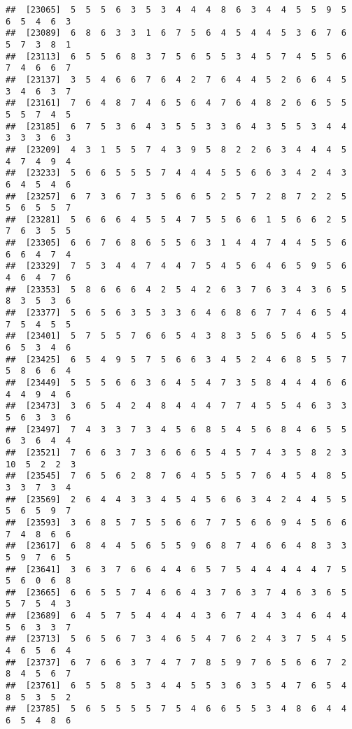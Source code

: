 \documentclass[
]{book}
\begin{document}
\begin{verbatim}
##  [23065]  5  5  5  6  3  5  3  4  4  4  8  6  3  4  4  5  5  9  5  6  5  4  6  3
##  [23089]  6  8  6  3  3  1  6  7  5  6  4  5  4  4  5  3  6  7  6  5  7  3  8  1
##  [23113]  6  5  5  6  8  3  7  5  6  5  5  3  4  5  7  4  5  5  6  7  4  6  6  7
##  [23137]  3  5  4  6  6  7  6  4  2  7  6  4  4  5  2  6  6  4  5  3  4  6  3  7
##  [23161]  7  6  4  8  7  4  6  5  6  4  7  6  4  8  2  6  6  5  5  5  5  7  4  5
##  [23185]  6  7  5  3  6  4  3  5  5  3  3  6  4  3  5  5  3  4  4  3  3  3  6  3
##  [23209]  4  3  1  5  5  7  4  3  9  5  8  2  2  6  3  4  4  4  5  4  7  4  9  4
##  [23233]  5  6  6  5  5  5  7  4  4  4  5  5  6  6  3  4  2  4  3  6  4  5  4  6
##  [23257]  6  7  3  6  7  3  5  6  6  5  2  5  7  2  8  7  2  2  5  5  6  5  5  7
##  [23281]  5  6  6  6  4  5  5  4  7  5  5  6  6  1  5  6  6  2  5  7  6  3  5  5
##  [23305]  6  6  7  6  8  6  5  5  6  3  1  4  4  7  4  4  5  5  6  6  6  4  7  4
##  [23329]  7  5  3  4  4  7  4  4  7  5  4  5  6  4  6  5  9  5  6  4  6  4  7  6
##  [23353]  5  8  6  6  6  4  2  5  4  2  6  3  7  6  3  4  3  6  5  8  3  5  3  6
##  [23377]  5  6  5  6  3  5  3  3  6  4  6  8  6  7  7  4  6  5  4  7  5  4  5  5
##  [23401]  5  7  5  5  7  6  6  5  4  3  8  3  5  6  5  6  4  5  5  6  5  3  4  6
##  [23425]  6  5  4  9  5  7  5  6  6  3  4  5  2  4  6  8  5  5  7  5  8  6  6  4
##  [23449]  5  5  5  6  6  3  6  4  5  4  7  3  5  8  4  4  4  6  6  4  4  9  4  6
##  [23473]  3  6  5  4  2  4  8  4  4  4  7  7  4  5  5  4  6  3  3  5  6  3  3  6
##  [23497]  7  4  3  3  7  3  4  5  6  8  5  4  5  6  8  4  6  5  5  6  3  6  4  4
##  [23521]  7  6  6  3  7  3  6  6  6  5  4  5  7  4  3  5  8  2  3 10  5  2  2  3
##  [23545]  7  6  5  6  2  8  7  6  4  5  5  5  7  6  4  5  4  8  5  3  3  7  3  4
##  [23569]  2  6  4  4  3  3  4  5  4  5  6  6  3  4  2  4  4  5  5  5  6  5  9  7
##  [23593]  3  6  8  5  7  5  5  6  6  7  7  5  6  6  9  4  5  6  6  7  4  8  6  6
##  [23617]  6  8  4  4  5  6  5  5  9  6  8  7  4  6  6  4  8  3  3  5  9  7  6  5
##  [23641]  3  6  3  7  6  6  4  4  6  5  7  5  4  4  4  4  4  7  5  5  6  0  6  8
##  [23665]  6  6  5  5  7  4  6  6  4  3  7  6  3  7  4  6  3  6  5  5  7  5  4  3
##  [23689]  6  4  5  7  5  4  4  4  4  3  6  7  4  4  3  4  6  4  4  5  6  3  3  7
##  [23713]  5  6  5  6  7  3  4  6  5  4  7  6  2  4  3  7  5  4  5  4  6  5  6  4
##  [23737]  6  7  6  6  3  7  4  7  7  8  5  9  7  6  5  6  6  7  2  8  4  5  6  7
##  [23761]  6  5  5  8  5  3  4  4  5  5  3  6  3  5  4  7  6  5  4  8  5  3  5  2
##  [23785]  5  6  5  5  5  5  7  5  4  6  6  5  5  3  4  8  6  4  4  6  5  4  8  6

\end{verbatim}
\end{document}
